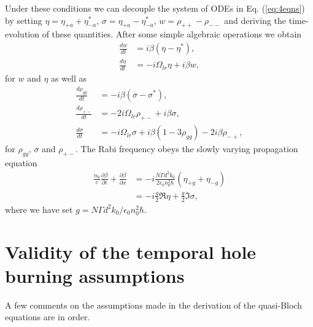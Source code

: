\documentclass[preprint,secnumarabic,amssymb, nobibnotes, aip, prd]{revtex4-1}
\def\p{\partial}
\begin{document}
Under these conditions we can decouple the system of ODEs in Eq. (\ref{eq:4eqns}) by setting $\eta = \eta_{+a}+\eta_{-a}^*$, $\sigma = \eta_{+a}-\eta_{-a}^*$, $w = \rho_{++}-\rho_{--}$ and deriving the time-evolution of these quantities. After some simple algebraic operations we obtain
\begin{align}
\frac{d w}{dt} &= i\beta(\eta-\eta^*), \\
\frac{d \eta}{dt} &= -i\Omega_{lr}\eta+i\beta w, \label{eq:eta}
\end{align}
for $w$ and $\eta$ as well as 
\begin{align}
\frac{d \rho_{gg}}{dt} &= - i\beta(\sigma-\sigma^*), \\
\frac{d \rho_{+-}}{dt} &= -2i\Omega_{lr}\rho_{+-}+i\beta\sigma,\\
\frac{d \sigma}{dt} &= -i\Omega_{lr}\sigma+i\beta(1-3\rho_{gg})-2i\beta\rho_{-+},
\end{align}
for $\rho_{gg}$, $\sigma$ and $\rho_{+-}$. The Rabi frequency obeys the slowly varying propagation equation 
\begin{align}
\frac{n_0}{c}\frac{\p \beta}{\p t} + \frac{\p \beta}{\p x} &= - i\frac{N\Gamma d^2 k_0}{2\epsilon_0n_0^2\hbar}(\eta_{+g}+\eta_{-g}) \nonumber \\
		&=  -i\frac{g}{2}\Re{\eta}+\frac{g}{2}\Im{\sigma}, \label{eq:rabi-freq}
\end{align}
where we have set $g =N\Gamma d^2 k_0/\epsilon_0n_0^2\hbar $. 





\section{Validity of the temporal hole burning assumptions}
A few comments on the assumptions made in the derivation of the quasi-Bloch equations are in order. 
\end{document}

